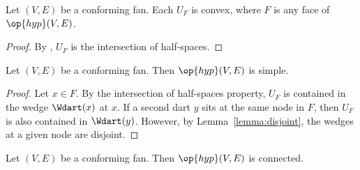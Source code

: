 \begin{lemma}[]
Let $(V,E)$ be a conforming fan.  
Each $U_F$ is convex, where  $F$ is any face of $\op{hyp}(V,E)$.
\end{lemma}
%
%

\begin{proof} By , $U_F$ is the intersection of
half-spaces.
\end{proof}

\begin{lemma}[]  
Let $(V,E)$ be a conforming fan.  
Then $\op{hyp}(V,E)$ is simple.
\end{lemma}
%

\begin{proof} Let $x\in F$.  By the intersection of half-spaces
property, $U_F$ is contained in the wedge $\Wdart(x)$ at $x$.  If
 a second dart $y$ sits at the same node in $F$, then $U_F$ is
also contained in $\Wdart(y)$. However, by
Lemma~\ref{lemma:disjoint}, the wedges at a given node are disjoint.
\end{proof}

\begin{lemma}[]  
Let $(V,E)$ be a conforming fan.  
Then $\op{hyp}(V,E)$ is connected.
\end{lemma}
%
%
%


